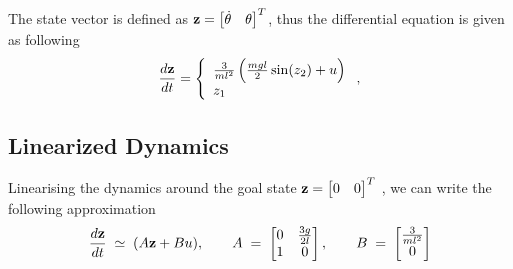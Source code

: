 \documentclass{article}
\newcommand{\bfz}{{\bf z}}
\begin{document}
The state vector is defined as $\bfz = \begin{bmatrix} \dot{\theta} & \theta \end{bmatrix}^T$, thus the differential equation is given as following
\begin{align*}
\frac{d\bfz}{dt}= \left\{ \begin{array}{l}
\frac{3}{ml^2} \left(\frac{mgl}{2} \sin (z_2) +  u \right) \\
 z_1
\end{array}\right. ,
\end{align*}


\subsection*{Linearized Dynamics}

Linearising the dynamics around the goal state $\bfz =\begin{bmatrix} 0 & 0 \end{bmatrix}^T$ , we can write the
following approximation
\[
\frac{d\bfz}{dt}\;\simeq\;(A\bfz+B u),\qquad
A\;=\;\begin{bmatrix}

0&\frac{3g}{2l}\\
1&0 \end{bmatrix},\qquad
B\;=\; \begin{bmatrix} \frac{3}{ml^2} \\ 0\end{bmatrix}
\]
\end{document}
